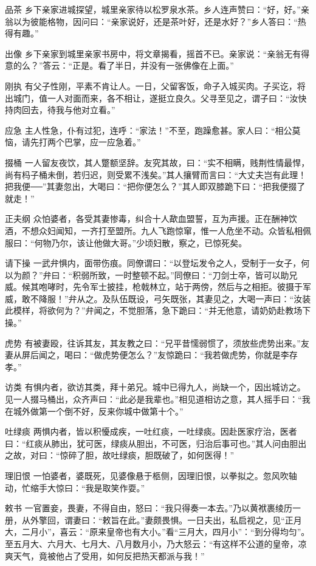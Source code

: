 \documentclass[12pt,UTF8]{ctexbook}
\begin{document}
品茶
乡下亲家进城探望，城里亲家待以松罗泉水茶。乡人连声赞曰：“好，好。”亲翁以为彼能格物，因问曰：“亲家说好，还是茶叶好，还是水好？”乡人答曰：“热得有趣。”

出像
乡下亲家到城里亲家书房中，将文章揭看，摇首不已。亲家说：“亲翁无有得意的么？”答云：“正是。看了半日，并没有一张佛像在上面。”

刚执
有父子性刚，平素不肯让人。一日，父留客饭，命子入城买肉。子买讫，将出城门，值一人对面而来，各不相让，遂挺立良久。父寻至见之，谓子曰：“汝快持肉回去，待我与他对立看。”

应急
主人性急，仆有过犯，连呼：“家法！”不至，跑躁愈甚。家人曰：“相公莫恼，请先打两个巴掌，应一应急着。”

掇桶
一人留友夜饮，其人蹩额坚辞。友究其故，曰：“实不相瞒，贱荆性情最悍，尚有杩子桶未倒，若归迟，则受累不浅矣。”其人攘臂而言曰：“大丈夫岂有此理！把我便──”其妻忽出，大喝曰：“把你便怎么？”其人即双膝跪下曰：“把我便掇了就走！”

正夫纲
众怕婆者，各受其妻惨毒，纠合十人歃血盟誓，互为声援。正在酬神饮酒，不想众妇闻知，一齐打至盟所。九人飞跑惊窜，惟一人危坐不动。众皆私相佩服曰：“何物乃尔，该让他做大哥。”少顷妇散，察之，已惊死矣。

请下操
一武弁惧内，面带伤痕。同僚谓曰：“以登坛发令之人，受制于一女子，何以为颜？”弁曰：“积弱所致，一时整顿不起。”同僚曰：“刀剑士卒，皆可以助兄威。候其咆哮时，先令军士披挂，枪戟林立，站于两傍，然后与之相拒。彼摄于军威，敢不降服！”弁从之。及队伍既设，弓矢既张，其妻见之，大喝一声曰：“汝装此模样，将欲何为？”弁闻之，不觉胆落，急下跪曰：“并无他意，请奶奶赴教场下操。”

虎势
有被妻殴，往诉其友，其友教之曰：“兄平昔懦弱惯了，须放些虎势出来。”友妻从屏后闻之，喝曰：“做虎势便怎么？”友惊跪曰：“我若做虎势，你就是李存孝。”

访类
有惧内者，欲访其类，拜十弟兄。城中已得九人，尚缺一个，因出城访之。见一人掇马桶出，众齐声曰：“此必是我辈也。”相见道相访之意，其人摇手曰：“我在城外做第一个倒不好，反来你城中做第十个。”

吐绿痰
两惧内者，皆以积懮成疾，一吐红痰，一吐绿痰。因赴医家疗治，医者曰：“红痰从肺出，犹可医，绿痰从胆出，不可医，归治后事可也。”其人问由胆出之故，对曰：“惊碎了胆，故吐绿痰，胆既破了，如何医得！”

理旧恨
一怕婆者，婆既死，见婆像悬于柩侧，因理旧恨，以拳拟之。忽风吹轴动，忙缩手大惊曰：“我是取笑作耍。”

敕书
一官置妾，畏妻，不得自由，怒曰：“我只得奏一本去。”乃以黄袱裹绫历一册，从外擎回，谓妻曰：“敕旨在此。”妻颇畏惧。一日夫出，私启视之，见“正月大，二月小”，喜云：“原来皇帝也有大小。”看“三月大，四月小”：“到分得均匀”。至五月大、六月大、七月大、八月数月小，乃大怒云：“有这样不公道的皇帝，凉爽天气，竟被他占了受用，如何反把热天都派与我！”
\end{document}

